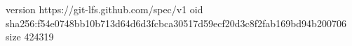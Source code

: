 version https://git-lfs.github.com/spec/v1
oid sha256:f54e0748bb10b713d64d6d3fcbca30517d59ecf20d3c8f2fab169bd94b200706
size 424319
